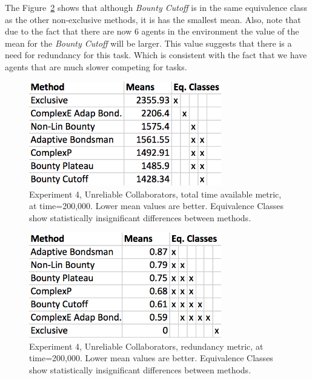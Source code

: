\documentclass[letterpaper]{aamas2015}
\begin{document}
The Figure~\ref{badR} shows that although \textit{Bounty Cutoff} is in the same equivalence class as the other non-exclusive methods, it is has the smallest mean.  Also, note that due to the fact that there are now 6 agents in the environment the value of the mean for the \textit{Bounty Cutoff} will be larger.  This value suggests that there is a need for redundancy for this task.  Which is consistent with the fact that we have agents that are much slower competing for tasks.

\begin{figure}[t]
\begin{center}\includegraphics[width=3.3in]{badT.png}\end{center}
\vspace{-0.5em}\caption{Experiment 4, Unreliable Collaborators, total time available metric, at time=200,000.  Lower mean values are better.  Equivalence Classes show statistically insignificant differences between methods.}
\label{badT}
\end{figure}

\begin{figure}[t]
\begin{center}\includegraphics[width=3.3in]{badR.png}\end{center}
\vspace{-0.5em}\caption{Experiment 4, Unreliable Collaborators, redundancy metric, at time=200,000.  Lower mean values are better.  Equivalence Classes show statistically insignificant differences between methods.}
\label{badR}
\end{figure}
\end{document}
